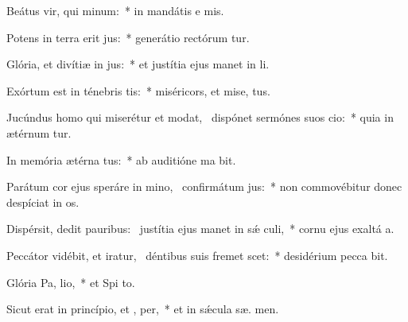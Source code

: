 \item Beátus vir, qui  minum:~* in mandátis e  mis.
\item Potens in terra erit  jus:~* generátio rectórum tur.
\item Glória, et divítiæ in  jus:~* et justítia ejus manet in  li.
\item Exórtum est in ténebris  tis:~* miséricors, et mise,  tus.
\item Jucúndus homo qui miserétur et modat,~\pscross{} dispónet sermónes suos  cio:~* quia in ætérnum  tur.
\item In memória ætérna  tus:~* ab auditióne ma  bit.
\item Parátum cor ejus speráre in mino,~\pscross{} confirmátum   jus:~* non commovébitur donec despíciat in os.
\item Dispérsit, dedit pauribus:~\pscross{} justítia ejus manet in sǽ culi,~* cornu ejus exaltá  a.
\item Peccátor vidébit, et iratur,~\pscross{} déntibus suis fremet  scet:~* desidérium pecca bit.
\item Glória Pa,  lio,~* et Spi to.
\item Sicut erat in princípio, et ,  per,~* et in sǽcula sæ. men.
